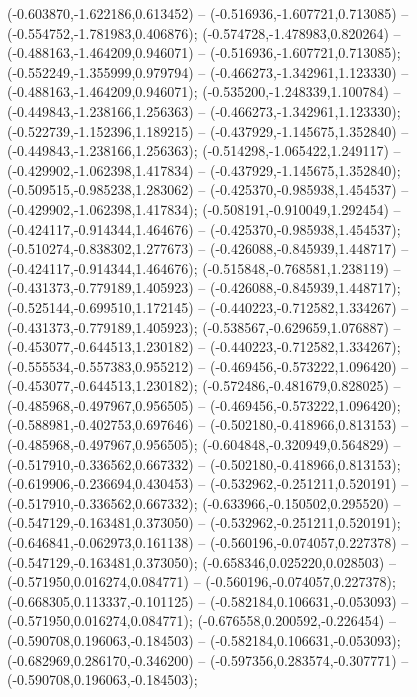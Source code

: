 (-0.603870,-1.622186,0.613452) -- (-0.516936,-1.607721,0.713085) -- (-0.554752,-1.781983,0.406876);
 (-0.574728,-1.478983,0.820264) -- (-0.488163,-1.464209,0.946071) -- (-0.516936,-1.607721,0.713085);
 (-0.552249,-1.355999,0.979794) -- (-0.466273,-1.342961,1.123330) -- (-0.488163,-1.464209,0.946071);
 (-0.535200,-1.248339,1.100784) -- (-0.449843,-1.238166,1.256363) -- (-0.466273,-1.342961,1.123330);
 (-0.522739,-1.152396,1.189215) -- (-0.437929,-1.145675,1.352840) -- (-0.449843,-1.238166,1.256363);
 (-0.514298,-1.065422,1.249117) -- (-0.429902,-1.062398,1.417834) -- (-0.437929,-1.145675,1.352840);
 (-0.509515,-0.985238,1.283062) -- (-0.425370,-0.985938,1.454537) -- (-0.429902,-1.062398,1.417834);
 (-0.508191,-0.910049,1.292454) -- (-0.424117,-0.914344,1.464676) -- (-0.425370,-0.985938,1.454537);
 (-0.510274,-0.838302,1.277673) -- (-0.426088,-0.845939,1.448717) -- (-0.424117,-0.914344,1.464676);
 (-0.515848,-0.768581,1.238119) -- (-0.431373,-0.779189,1.405923) -- (-0.426088,-0.845939,1.448717);
 (-0.525144,-0.699510,1.172145) -- (-0.440223,-0.712582,1.334267) -- (-0.431373,-0.779189,1.405923);
 (-0.538567,-0.629659,1.076887) -- (-0.453077,-0.644513,1.230182) -- (-0.440223,-0.712582,1.334267);
 (-0.555534,-0.557383,0.955212) -- (-0.469456,-0.573222,1.096420) -- (-0.453077,-0.644513,1.230182);
 (-0.572486,-0.481679,0.828025) -- (-0.485968,-0.497967,0.956505) -- (-0.469456,-0.573222,1.096420);
 (-0.588981,-0.402753,0.697646) -- (-0.502180,-0.418966,0.813153) -- (-0.485968,-0.497967,0.956505);
 (-0.604848,-0.320949,0.564829) -- (-0.517910,-0.336562,0.667332) -- (-0.502180,-0.418966,0.813153);
 (-0.619906,-0.236694,0.430453) -- (-0.532962,-0.251211,0.520191) -- (-0.517910,-0.336562,0.667332);
 (-0.633966,-0.150502,0.295520) -- (-0.547129,-0.163481,0.373050) -- (-0.532962,-0.251211,0.520191);
 (-0.646841,-0.062973,0.161138) -- (-0.560196,-0.074057,0.227378) -- (-0.547129,-0.163481,0.373050);
 (-0.658346,0.025220,0.028503) -- (-0.571950,0.016274,0.084771) -- (-0.560196,-0.074057,0.227378);
 (-0.668305,0.113337,-0.101125) -- (-0.582184,0.106631,-0.053093) -- (-0.571950,0.016274,0.084771);
 (-0.676558,0.200592,-0.226454) -- (-0.590708,0.196063,-0.184503) -- (-0.582184,0.106631,-0.053093);
 (-0.682969,0.286170,-0.346200) -- (-0.597356,0.283574,-0.307771) -- (-0.590708,0.196063,-0.184503);
